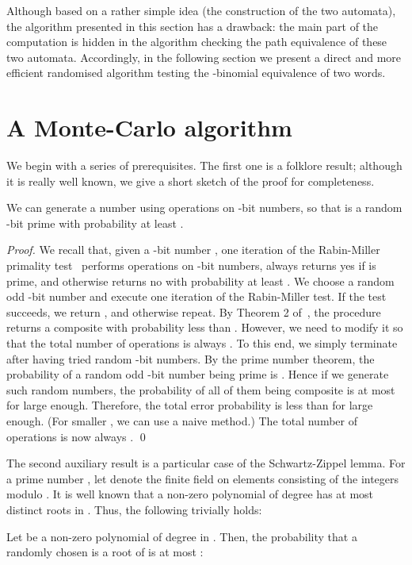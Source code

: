 \documentclass[runningheads]{llncs}
\begin{document}
Although based on a rather simple idea (the construction of the two automata), the algorithm presented in this section has a drawback: the main part of the computation is hidden in the algorithm checking the path equivalence of these two automata. Accordingly, in the following section we present a direct and more efficient randomised algorithm testing the -binomial equivalence of two words.

\section{A Monte-Carlo algorithm}

We begin with a series of prerequisites. The first one is a folklore result; although it is really well known, 
we give a short sketch of the proof for completeness.
\begin{lemma}\label{prime}
We can generate a number  using  operations on -bit numbers, so that  is a random -bit prime with probability at least .
\end{lemma}

\begin{proof}
We recall that, given a -bit number , one iteration of the Rabin-Miller primality test~\cite{RM} performs  operations on -bit numbers, always returns yes if  is prime, and otherwise returns no with probability at least . We choose a random odd -bit number  and execute one iteration of the Rabin-Miller test. If the test succeeds, we return , and otherwise repeat. By Theorem 2 of~\cite{Pomerance}, the procedure returns a composite  with probability less than . However, we need to modify it so that the total number of operations is always .
To this end, we simply terminate after having tried  random -bit numbers.
By the prime number theorem, the probability of a random odd -bit number being prime is . Hence if we generate  such random numbers, the probability of all of them being composite is at most  for  large enough. Therefore, the total error probability is less than  for  large enough. (For smaller , we can use a naive method.) The total number of operations is now always .
\qed
\end{proof}

The second auxiliary result is a particular case of the Schwartz-Zippel lemma. For a prime number , let  denote the finite field on  elements consisting of the integers modulo . It is well known that a non-zero polynomial  of degree  has at most  distinct roots in . Thus, the following trivially holds:
\begin{lemma}\label{SZ}
Let  be a non-zero polynomial of degree  in . Then, the probability that a randomly chosen  is a root of  is at most :
 
\end{lemma}
\end{document}
